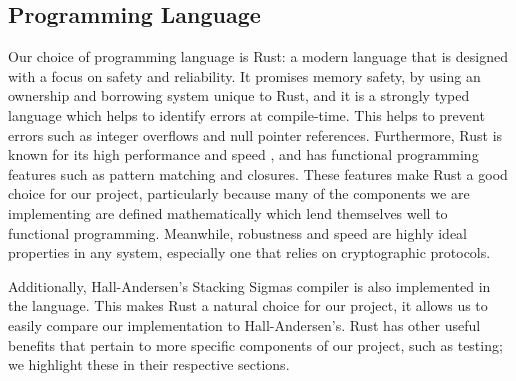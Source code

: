 \subsection{Programming Language}
Our choice of programming language is Rust: a modern 
language that is designed with a focus on safety and reliability.
It promises memory safety, by using an ownership and borrowing
system unique to Rust, and it is a strongly typed language which 
helps to identify errors at compile-time. This helps to prevent errors such 
as integer overflows and null pointer references. Furthermore, 
Rust is known for its high performance and speed \cite{rust-book}, and 
has functional programming features such as pattern matching and 
closures. These features make Rust a good choice for our project,
particularly because many of the components we are implementing are 
defined mathematically which lend themselves well to functional 
programming. Meanwhile, robustness and speed are highly ideal properties
in any system, especially one that relies on cryptographic protocols.

Additionally, Hall-Andersen's \cite{MHAStackSig}
Stacking Sigmas compiler is also implemented in the language. This makes 
Rust a natural choice for our project, it allows us to easily compare 
our implementation to Hall-Andersen's. Rust has other useful benefits 
that pertain to more specific components of our project, such as 
testing; we highlight these in their respective sections.

